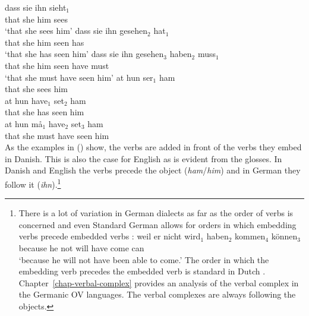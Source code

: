 \eal
\ex
\gll dass sie ihn sieht$_1$\\
     that she him sees\\
\glt `that she sees him'
\ex
\gll dass sie ihn gesehen$_2$ hat$_1$\\
     that she him seen        has\\
\glt `that she has seen him'
\ex
\gll dass sie ihn gesehen$_3$ haben$_2$ muss$_1$\\
     that she him seen        have     must\\
\glt `that she must have seen him'
\zl
\eal
\label{ex-Danish-embedding}
\ex
\gll at   hun ser$_1$ ham\\
     that she  sees    him\\
\ex
\gll at   hun have$_1$ set$_2$ ham\\
     that she  has      seen    him\\
\ex
\gll at   hun må$_1$ have$_2$ set$_3$ ham\\
     that she  must   have     seen   him\\
\zl
%
As the examples in () show, the verbs are added in front of the verbs they embed in
Danish. This is also the case for English as is evident from the glosses. In Danish and English the
verbs precede the object (\emph{ham}/\emph{him}) and in German they follow it
(\emph{ihn}).\footnote{
There is a lot of variation in German dialects as far as the order of verbs is concerned and even
Standard German allows for orders in which embedding verbs precede embedded verbs \parencites[--64]{Bech55a}[]{dBE83a}:
\ea
\gll weil er nicht wird$_1$ haben$_2$ kommen$_4$ können$_3$\\
     because he not will have come   can\\\german
\glt `because he will not have been able to come.'
\z
The order in which the embedding verb precedes the embedded verb is standard in Dutch \citep[]{dBE83a}. Chapter~\ref{chap-verbal-complex}
provides an analysis of the verbal complex in the Germanic OV languages. The verbal complexes are
always following the objects.  
} 

